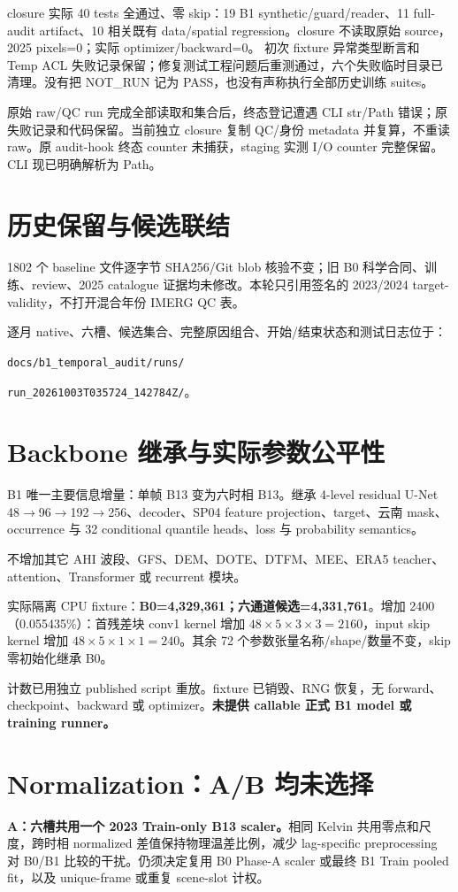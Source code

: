 \documentclass[UTF8,11pt,a4paper,fontset=windows]{ctexart}
\begin{document}
closure 实际 40 tests 全通过、零 skip：19 B1 synthetic/guard/reader、11 full-audit artifact、10 相关既有 data/spatial regression。closure 不读取原始 source，2025 pixels=0；实际 optimizer/backward=0。
初次 fixture 异常类型断言和 Temp ACL 失败记录保留；修复测试工程问题后重测通过，六个失败临时目录已清理。没有把 NOT\_RUN 记为 PASS，也没有声称执行全部历史训练 suites。

原始 raw/QC run 完成全部读取和集合后，终态登记遭遇 CLI str/Path 错误；原失败记录和代码保留。当前独立 closure 复制 QC/身份 metadata 并复算，不重读 raw。原 audit-hook 终态 counter 未捕获，staging 实测 I/O counter 完整保留。CLI 现已明确解析为 Path。

\section*{历史保留与候选联结}
1802 个 baseline 文件逐字节 SHA256/Git blob 核验不变；旧 B0 科学合同、训练、review、2025 catalogue 证据均未修改。本轮只引用签名的 2023/2024 target-validity，不打开混合年份 IMERG QC 表。

逐月 native、六槽、候选集合、完整原因组合、开始/结束状态和测试日志位于：\par
{\small\texttt{docs/b1\_temporal\_audit/runs/}}\par
{\small\texttt{run\_20261003T035724\_142784Z/}}。
\newpage
\section*{Backbone 继承与实际参数公平性}
B1 唯一主要信息增量：单帧 B13 变为六时相 B13。继承 4-level residual U-Net 48$\rightarrow$96$\rightarrow$192$\rightarrow$256、decoder、SP04 feature projection、target、云南 mask、occurrence 与 32 conditional quantile heads、loss 与 probability semantics。

不增加其它 AHI 波段、GFS、DEM、DOTE、DTFM、MEE、ERA5 teacher、attention、Transformer 或 recurrent 模块。

实际隔离 CPU fixture：\textbf{B0=4,329,361；六通道候选=4,331,761}。增加 2400（0.055435\%）：首残差块 conv1 kernel 增加 $48\times5\times3\times3=2160$，input skip kernel 增加 $48\times5\times1\times1=240$。其余 72 个参数张量名称/shape/数量不变，skip 零初始化继承 B0。

计数已用独立 published script 重放。fixture 已销毁、RNG 恢复，无 forward、checkpoint、backward 或 optimizer。\textbf{未提供 callable 正式 B1 model 或 training runner。}

\section*{Normalization：A/B 均未选择}
\textbf{A：六槽共用一个 2023 Train-only B13 scaler。}相同 Kelvin 共用零点和尺度，跨时相 normalized 差值保持物理温差比例，减少 lag-specific preprocessing 对 B0/B1 比较的干扰。仍须决定复用 B0 Phase-A scaler 或最终 B1 Train pooled fit，以及 unique-frame 或重复 scene-slot 计权。
\end{document}
